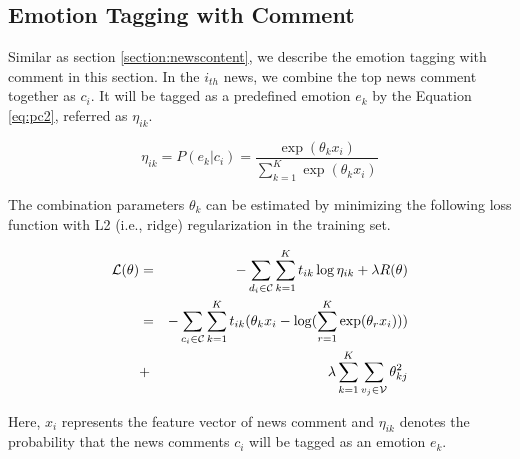 \documentclass{IEEEtran}
\begin{document}
\subsection{Emotion Tagging with Comment}
\label{section:newscomment}
Similar as section \ref{section:newscontent}, we describe the emotion tagging with comment in this section.  In the $i_{th}$ news, we combine the top news comment together as $c_i$. It will be tagged as a predefined emotion $e_k$ by the Equation \ref{eq:pc2}, referred as $\eta_{ik}$.

\vspace{-5pt}
\begin{equation}
\label{eq:pc2}
{\eta _{ik}} = P({e_k}|{c_i}) = \frac{{\exp ({\theta _k}{x_i})}}{{\sum\limits_{k = 1}^K {\exp } ({\theta _k}{x_i})}}
\end{equation}
\vspace{-7pt}

The combination parameters $\theta_{k}$ can be estimated by minimizing the following loss function with L2 (i.e., ridge) regularization in the training set.

\vspace{-5pt}
\begin{eqnarray}
{\cal L}(\theta ) &=&  - \sum\limits_{{d_i} \in {\cal C}} {\sum\limits_{k = 1}^K {{t_{ik}}} } \log {\eta _{ik}} + \lambda R(\theta )\\
&=&  - \sum\limits_{{c_i} \in {\cal C}} {\sum\limits_{k = 1}^K {{t_{ik}}} } ({\theta _k}{x_i} - \log (\sum\limits_{r = 1}^K {\exp } ({\theta _r}{x_i}))) \nonumber \\
&+& \lambda \sum\limits_{k = 1}^K {\sum\limits_{{v_j} \in {\cal V}} {\theta _{kj}^2} } \nonumber
\end{eqnarray}
\vspace{-5pt}


Here, $x_{i}$ represents the feature vector of news comment and $\eta_{ik}$ denotes the probability that the news comments $c_i$ will be tagged as an emotion $e_k$.
\end{document}
